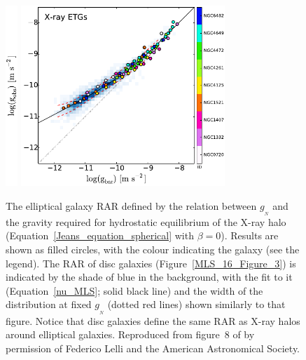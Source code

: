 \documentclass[fleqn,usenatbib,useAMS]{mnras} %
\begin{document}
\begin{figure}
	\centering
	\includegraphics[height=6.8cm]{Lelli_2017_Figure_8_ylabel}
	\includegraphics[height=6.8cm]{Lelli_2017_Figure_8_right}
	\caption{The elliptical galaxy RAR defined by the relation between $g_{_N}$ and the gravity required for hydrostatic equilibrium of the X-ray halo (Equation~\ref{Jeans_equation_spherical} with $\beta = 0$). Results are shown as filled circles, with the colour indicating the galaxy (see the legend). The RAR of disc galaxies (Figure~\ref{MLS_16_Figure_3}) is indicated by the shade of blue in the background, with the fit to it (Equation~\ref{nu_MLS}; solid black line) and the width of the distribution at fixed $g_{_N}$ (dotted red lines) shown similarly to that figure. Notice that disc galaxies define the same RAR as X-ray halos around elliptical galaxies. Reproduced from figure~8 of \citet{Lelli_2017} by permission of Federico Lelli and the American Astronomical Society.}
	\label{Lelli_2017_Figure_8_right}
\end{figure}
\end{document}

